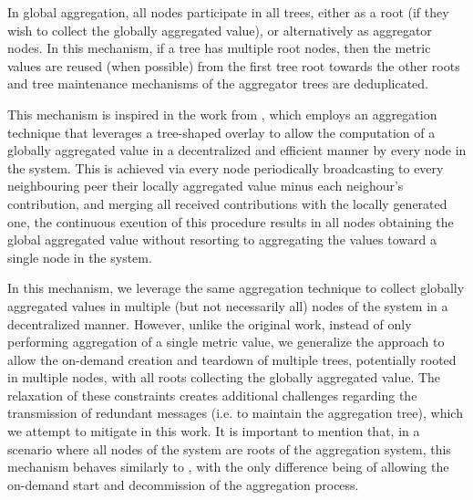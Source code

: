 In global aggregation, all nodes participate in all trees, either as a root (if they wish to collect the globally aggregated value), or alternatively as aggregator nodes. In this mechanism, if a tree has multiple root nodes, then the metric values are reused (when possible) from the first tree root towards the other roots and tree maintenance mechanisms of the aggregator trees are deduplicated. 

This mechanism is inspired in the work from , which employs an aggregation technique that leverages a tree-shaped overlay to allow the computation of a globally aggregated value in a decentralized and efficient manner by every node in the system. This is achieved via every node periodically broadcasting to every neighbouring peer their locally aggregated value minus each neighour's contribution, and merging all received contributions with the locally generated one, the continuous exeution of this procedure results in all nodes obtaining the global aggregated value without resorting to aggregating the values toward a single node in the system.

In this mechanism, we leverage the same aggregation technique to collect globally aggregated values in multiple (but not necessarily all) nodes of the system in a decentralized manner. However, unlike the original work, instead of only performing aggregation of a single metric value, we generalize the approach to allow the on-demand creation and teardown of multiple trees, potentially rooted in multiple nodes, with all roots collecting the globally aggregated value. The relaxation of these constraints creates additional challenges regarding the transmission of redundant messages (i.e. to maintain the aggregation tree), which we attempt to mitigate in this work. It is important to mention that, in a scenario where all nodes of the system are roots of the aggregation system, this mechanism behaves similarly to , with the only difference being of allowing the on-demand start and decommission of the aggregation process.



